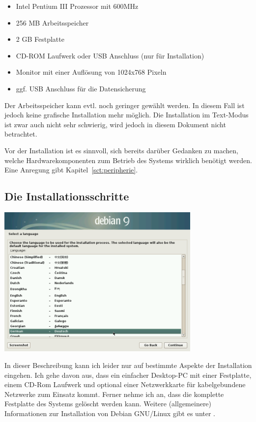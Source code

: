 \documentclass[a4paper,12pt,twoside]{article}
\begin{document}
\begin{itemize}
    \item Intel Pentium III Prozessor mit 600MHz
    \item 256 MB Arbeitsspeicher
    \item 2 GB Festplatte
    \item CD-ROM Laufwerk oder USB Anschluss (nur für Installation)
    \item Monitor mit einer Auflösung von 1024x768 Pixeln
    \item ggf. USB Anschluss für die Datensicherung
\end{itemize}

Der Arbeitsspeicher kann evtl. noch geringer gewählt werden. In diesem
Fall ist jedoch keine grafische Installation mehr möglich. Die
Installation im Text-Modus ist zwar auch nicht sehr schwierig, wird
jedoch in diesem Dokument nicht betrachtet.

Vor der Installation ist es sinnvoll, sich bereits darüber Gedanken zu
machen, welche Hardwarekomponenten zum Betrieb des Systems wirklich
benötigt werden. Eine Anregung gibt Kapitel~\ref{sct:peripherie}.


\subsection{Die Installationsschritte}
\label{sct:inst_schritte}

\begin{minipage}{\linewidth}
    \centering
    \captionsetup{type=figure}
    \includegraphics[width=10cm]{screenshots/select_language.png}
    \label{fig:inst_sprache}
\end{minipage}

\bigskip
In dieser Beschreibung kann ich leider nur auf bestimmte Aspekte der
Installation eingehen. Ich gehe davon aus, dass ein einfacher
Desktop-PC mit einer Festplatte, einem CD-Rom Laufwerk und optional
einer Netzwerkkarte für kabelgebundene Netzwerke zum Einsatz kommt.
Ferner nehme ich an, dass die komplette Festplatte des Systems gelöscht
werden kann. Weitere (allgemeinere) Informationen zur Installation von
Debian GNU/Linux gibt es unter \cite{DEB2}.
\end{document}
